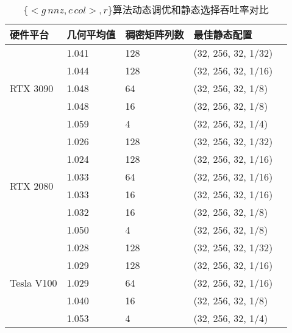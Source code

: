 \begin{table}
  \centering
  \caption{$\{<g\,nnz , c\,col>,r\}$算法动态调优和静态选择吞吐率对比}
  \begin{tabular}{lllll}
  \toprule
  硬件平台 & 几何平均值  & 稠密矩阵列数 & 最佳静态配置 \\
  \midrule
  \multirow{5}{*}{RTX 3090}& 1.041  & 128 & (32, 256, 32, 1/32)\\
                          & 1.044   & 128 & (32, 256, 32, 1/16)\\
                          & 1.048   & 64 & (32, 256, 32, 1/8)\\
                          & 1.048   & 16 & (32, 256, 32, 1/8)\\
                          & 1.059   & 4 & (32, 256, 32, 1/4)\\
  \hline
  \multirow{6}{*}{RTX 2080}& 1.026  & 128 & (32, 256, 32, 1/32)\\
                          & 1.024   & 128 & (32, 256, 32, 1/16)\\
                          & 1.033   & 64 & (32, 256, 32, 1/16)\\
                          & 1.033   & 16 & (32, 256, 32, 1/16)\\
                          & 1.032   & 16& (32, 256, 32, 1/8)\\
                          & 1.050   & 4 & (32, 256, 32, 1/8)\\
  \hline
  \multirow{5}{*}{Tesla V100}& 1.028  & 128 & (32, 256, 32, 1/32)\\
                          & 1.029   & 128 & (32, 256, 32, 1/16)\\
                          & 1.029   & 64 & (32, 256, 32, 1/16)\\
                          & 1.040   & 16 & (32, 256, 32, 1/8)\\
                          & 1.053   & 4 & (32, 256, 32, 1/4)\\
  \bottomrule
  \end{tabular}
  \label{tab:over-sta-eb}
\end{table}
